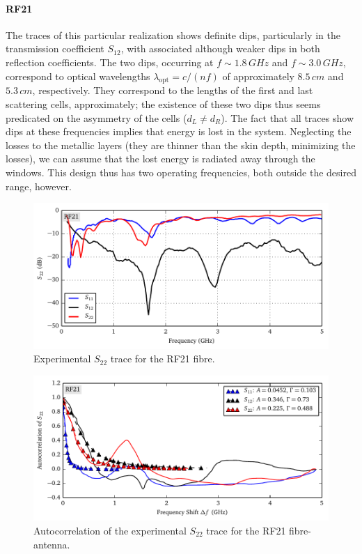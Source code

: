 \paragraph{RF21}
The traces of this particular realization shows definite dips, particularly
in the transmission coefficient $S_{12}$, with associated although weaker
dips in both reflection coefficients. The two dips, occurring at $f\sim1.8\,\unit{GHz}$
and $f\sim3.0\,\unit{GHz}$, correspond to optical wavelengths $\lambda_\text{opt}=c/(nf)$ 
of approximately $8.5\,\unit{cm}$ and $5.3\,\unit{cm}$, respectively. They correspond
to the lengths of the first and last scattering cells, approximately; the existence
of these two dips thus seems predicated on the asymmetry of the cells ($d_L\neq d_R$). The fact that all
traces show dips at these frequencies implies that energy is lost in the system. Neglecting
the losses to the metallic layers (they are thinner than the skin depth, minimizing the losses),
we can assume that the lost energy is radiated away through the windows. This design thus 
has two operating frequencies, both outside the desired range, however. 


\begin{figure}[h]
 \centering
 \includegraphics{figs/active/RF21-sParameters.pdf}
 \caption[Experimental $S_{22}$ trace for the RF21 fibre]
 		{Experimental $S_{22}$ trace for the RF21 fibre.}
 \label{fig:active.lcx.rf21sParameters}
\end{figure}

\begin{figure}[h]
 \centering
 \includegraphics{figs/active/RF21-autoCorrelation.pdf}
 \caption[Autocorrelation of the experimental $S_{22}$ trace for the RF21 fibre-antenna]
 		{Autocorrelation of the experimental $S_{22}$ trace for the RF21 fibre-antenna.}
 \label{fig:active.lcx.rf21autocorrelation}
\end{figure}

